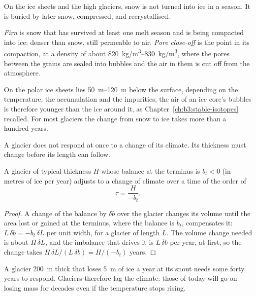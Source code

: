 On the ice sheets and the high glaciers, snow is not turned into ice in a
season. It is buried by later snow, compressed, and recrystallised.

\begin{definition}\label{def:b3:glaciology:firn}
\emph{Firn} is snow that has survived at least one melt season
and is being compacted into ice: denser than snow, still permeable to air.
\emph{Pore close-off} is the point in its
compaction, at a density of about \qtyrange{820}{830}{kg/m^3}, where the
pores between the grains are sealed into bubbles and the air in them is cut
off from the atmosphere.
\end{definition}

On the polar ice sheets  lies \qtyrange{50}{120}{m} below the
surface, depending on the temperature, the accumulation and the
impurities; the air of an ice core's bubbles is therefore younger than the
ice around it, as Chapter~\ref{ch:b3:stable-isotopes} recalled. For most
glaciers the change from snow to ice takes more than a hundred years.

A glacier does not respond at once to a change of its climate. Its thickness
must change before its length can follow.

\begin{proposition}\label{prop:b3:glaciology:response}
A glacier of typical thickness $H$ whose balance at the terminus is $b_t <
0$ (in metres of ice per year) adjusts to a change of climate over a time of
the order of
\[
\tau = \frac{H}{-b_t} .
\]
\end{proposition}

\begin{proof}
A change of the balance by $\delta b$ over the glacier changes its volume
until the area lost or gained at the terminus, where the balance is $b_t$,
compensates it: $L\,\delta b = -b_t\,\delta L$ per unit width, for a
glacier of length $L$. The volume change needed is about $H\,\delta L$, and
the imbalance that drives it is $L\,\delta b$ per year, at first, so the
change takes $H\,\delta L/(L\,\delta b) = H/(-b_t)$ years.
\end{proof}

A glacier \qty{200}{m} thick that loses \qty{5}{m} of ice a year at its
snout needs some forty years to respond. Glaciers therefore lag the
climate: those of today will go on losing mass for decades even if the
temperature stops rising.

